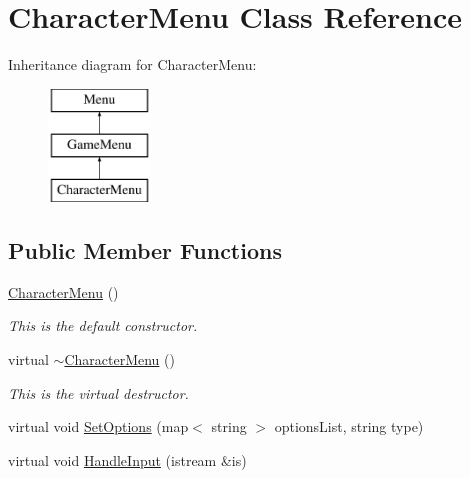 \hypertarget{classCharacterMenu}{\section{Character\-Menu Class Reference}
\label{classCharacterMenu}
}
Inheritance diagram for Character\-Menu\-:\begin{figure}[H]
\begin{center}
\leavevmode
\includegraphics[height=3.000000cm]{classCharacterMenu}
\end{center}
\end{figure}
\subsection*{Public Member Functions}
\begin{DoxyCompactItemize}
\item 
\hypertarget{classCharacterMenu_a1cccb5ffc144797bd6472e0839c38c03}{\hyperlink{classCharacterMenu_a1cccb5ffc144797bd6472e0839c38c03}{Character\-Menu} ()}\label{classCharacterMenu_a1cccb5ffc144797bd6472e0839c38c03}

\begin{DoxyCompactList}\small\item\em This is the default constructor. \end{DoxyCompactList}\item 
\hypertarget{classCharacterMenu_a6e7e278406e10cd6eb0f3d5aea5fb4b2}{virtual \hyperlink{classCharacterMenu_a6e7e278406e10cd6eb0f3d5aea5fb4b2}{$\sim$\-Character\-Menu} ()}\label{classCharacterMenu_a6e7e278406e10cd6eb0f3d5aea5fb4b2}

\begin{DoxyCompactList}\small\item\em This is the virtual destructor. \end{DoxyCompactList}\item 
virtual void \hyperlink{classCharacterMenu_a374493bc5b1e04b13647482c98df5fd6}{Set\-Options} (map$<$ string $>$ options\-List, string type)
\item 
virtual void \hyperlink{classCharacterMenu_a7a9163eec7ac69aeb5431869a0675646}{Handle\-Input} (istream \&is)
\end{DoxyCompactItemize}

